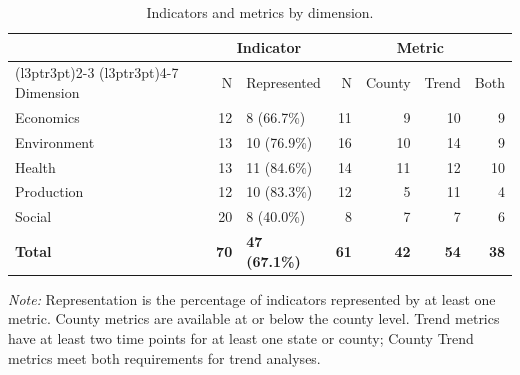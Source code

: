 \begin{table}
\centering
\caption{\label{tab:tab_metric_breakdown}Indicators and metrics by dimension.}
\centering
\fontsize{10}{12}\selectfont
\begin{threeparttable}
\begin{tabular}[t]{lrlrrrr}
\toprule
\multicolumn{1}{c}{ } & \multicolumn{2}{c}{Indicator} & \multicolumn{4}{c}{Metric} \\
\cmidrule(l{3pt}r{3pt}){2-3} \cmidrule(l{3pt}r{3pt}){4-7}
Dimension & N & Represented & N & County & Trend & Both\\
\midrule
Economics & 12 & 8 (66.7\%) & 11 & 9 & 10 & 9\\
Environment & 13 & 10 (76.9\%) & 16 & 10 & 14 & 9\\
Health & 13 & 11 (84.6\%) & 14 & 11 & 12 & 10\\
Production & 12 & 10 (83.3\%) & 12 & 5 & 11 & 4\\
Social & 20 & 8 (40.0\%) & 8 & 7 & 7 & 6\\
\addlinespace
\textbf{Total} & \textbf{70} & \textbf{47 (67.1\%)} & \textbf{61} & \textbf{42} & \textbf{54} & \textbf{38}\\
\bottomrule
\end{tabular}
\begin{tablenotes}
\item \textit{Note:} Representation is the percentage of indicators represented by at least one metric. County metrics are available at or below the county level. Trend metrics have at least two time points for at least one state or county; County Trend metrics meet both requirements for trend analyses.
\end{tablenotes}
\end{threeparttable}
\end{table}
